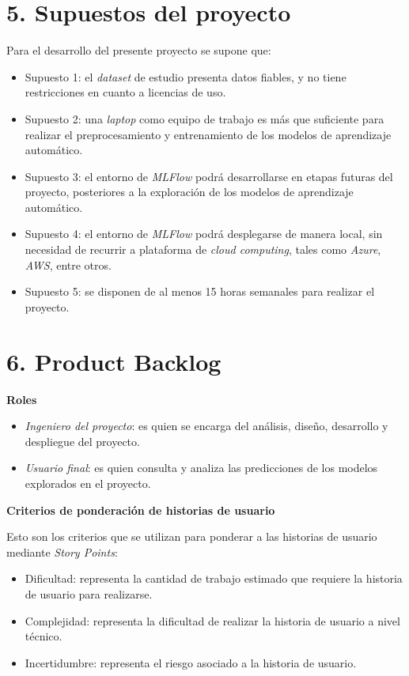 \documentclass[
11pt, %
]{charter}
\begin{document}
\section{5. Supuestos del proyecto}
\label{sec:supuestos}

Para el desarrollo del presente proyecto se supone que:
\begin{itemize}
	\item Supuesto 1: el \textit{dataset} de estudio presenta datos fiables, y no tiene restricciones en cuanto a licencias de uso.
	\item Supuesto 2: una \textit{laptop} como equipo de trabajo es más que suficiente para realizar el preprocesamiento y entrenamiento de los modelos de aprendizaje automático.
	\item Supuesto 3: el entorno de \textit{MLFlow} podrá desarrollarse en etapas futuras del proyecto, posteriores a la exploración de los modelos de aprendizaje automático.
    \item Supuesto 4: el entorno de \textit{MLFlow} podrá desplegarse de manera local, sin necesidad de recurrir a plataforma de \textit{cloud computing}, tales como \textit{Azure}, \textit{AWS}, entre otros.
    \item Supuesto 5: se disponen de al menos 15 horas semanales para realizar el proyecto.
\end{itemize}

\section{6. Product Backlog}
\label{sec:backlog}
\textbf{Roles}
\begin{itemize}
    \item \textit{Ingeniero del proyecto}: es quien se encarga del análisis, diseño, desarrollo y despliegue del proyecto.
    \item \textit{Usuario final}: es quien consulta y analiza las predicciones de los modelos explorados en el proyecto.
\end{itemize}

\textbf{Criterios de ponderación de historias de usuario}

Esto son los criterios que se utilizan para ponderar a las historias de usuario mediante \textit{Story Points}:
\begin{itemize}
    \item Dificultad: representa la cantidad de trabajo estimado que requiere la historia de usuario para realizarse.
    \item Complejidad: representa la dificultad de realizar la historia de usuario a nivel técnico.
    \item Incertidumbre: representa el riesgo asociado a la historia de usuario.
\end{itemize}
\end{document}
